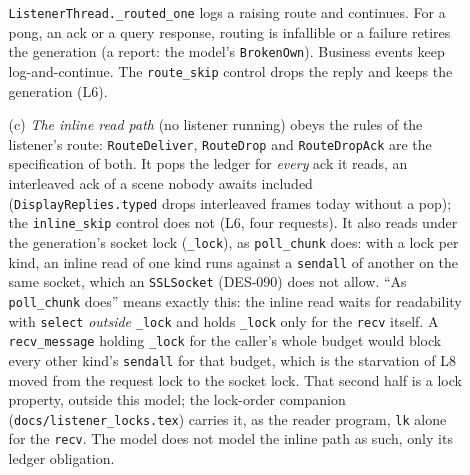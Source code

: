 \documentclass[a4paper,10pt,fleqn]{article}
\begin{document}
\begin{enumerate}
\begin{enumerate}
        \texttt{ListenerThread.\_routed\_one} logs a raising route and
        continues.  For a pong, an ack or a query response, routing is
        infallible or a failure retires the generation (a report: the model's
        \texttt{BrokenOwn}).  Business events keep log-and-continue.  The
        \texttt{route\_skip} control drops the reply and keeps the generation
        (L6).
      \item[(c)] \emph{The inline read path} (no listener running) obeys the
        rules of the listener's route: \texttt{RouteDeliver},
        \texttt{RouteDrop} and \texttt{RouteDropAck} are the specification of
        both.  It pops the ledger for \emph{every} ack it reads, an
        interleaved ack of a scene nobody awaits included
        (\texttt{DisplayReplies.typed} drops interleaved frames today without
        a pop); the \texttt{inline\_skip} control does not (L6, four
        requests).  It also reads under the generation's socket lock
        (\texttt{\_lock}), as \texttt{poll\_chunk} does: with a lock per kind,
        an inline read of one kind runs against a \texttt{sendall} of another
        on the same socket, which an \texttt{SSLSocket} (DES-090) does not
        allow.  ``As \texttt{poll\_chunk} does'' means exactly this: the
        inline read waits for readability with \texttt{select} \emph{outside}
        \texttt{\_lock} and holds \texttt{\_lock} only for the \texttt{recv}
        itself.  A \texttt{recv\_message} holding \texttt{\_lock} for the
        caller's whole budget would block every other kind's \texttt{sendall}
        for that budget, which is the starvation of L8 moved from the request
        lock to the socket lock.  That second half is a lock property,
        outside this model; the lock-order companion
        (\texttt{docs/listener\_locks.tex}) carries it, as the reader
        program, \texttt{lk} alone for the \texttt{recv}.  The model does not model the inline path as such, only
        its ledger obligation.
    \end{enumerate}
\end{enumerate}
\end{document}
